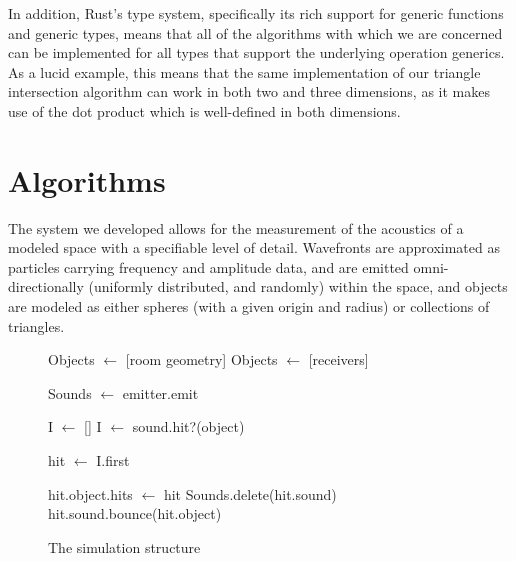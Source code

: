 \documentclass[10pt]{article}
\begin{document}
In addition, Rust's type system, specifically its rich support for generic
functions and generic types, means that all of the algorithms with which we are
concerned can be implemented for all types that support the underlying operation
generics.  As a lucid example, this means that the same implementation of our
triangle intersection algorithm can work in both two and three dimensions, as it
makes use of the dot product which is well-defined in both dimensions.

\section{Algorithms}

The system we developed allows for the measurement of the acoustics of a modeled
space with a specifiable level of detail.  Wavefronts are approximated as
particles carrying frequency and amplitude data, and are emitted
omni-directionally (uniformly distributed, and randomly) within the space, and
objects are modeled as either spheres (with a given origin and radius) or
collections of triangles.

\begin{wrapfigure}{o}{0.5\textwidth}
  \begin{minipage}{0.5\textwidth}
    \begin{algorithm}[H]
      \caption{The simulation structure}
      \label{simalg}
      \scriptsize
      \begin{algorithmic}
        \STATE Objects $\gets$ [room geometry]
        \STATE Objects $\gets$ [receivers]

        \STATE Sounds $\gets$ emitter.emit
        \ENDFOR

        \REPEAT

        \STATE I $\gets$ []
        \STATE I $\gets$ sound.hit?(object)
        \ENDFOR

        \STATE hit $\gets$ I.first

        \STATE hit.object.hits $\gets$ hit
        \STATE Sounds.delete(hit.sound)
        \ELSE
        \STATE hit.sound.bounce(hit.object)
        \ENDIF

        \ENDFOR

      \end{algorithmic}
    \end{algorithm}
  \end{minipage}
\end{wrapfigure}
\end{document}
